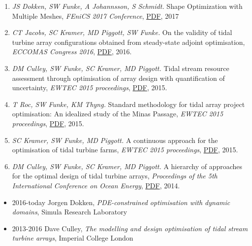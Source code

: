 \documentclass[11pt]{article}
\newenvironment{outerlist}[1][\enskip\textbullet]
        {\begin{itemize}[ #1]}{\end{itemize}}
\begin{document}
\begin{enumerate}
    \item \textit{JS Dokken, SW Funke, A Johannsson, S Schmidt.} Shape Optimization with Multiple Meshes, \textit{FEniCS 2017 Conference}, \href{https://github.com/funsim/cv/raw/master/publications/fenics_2017_proceedings.pdf}{PDF}, 2017
    \item \textit{CT Jacobs, SC Kramer, MD Piggott, SW Funke.} On the validity of tidal turbine array configurations obtained from steady-state adjoint optimisation, \textit{ECCOMAS Congress 2016}, \href{https://github.com/funsim/cv/raw/master/publications/jacobs_eccomas_2016.pdf}{PDF}, 2016.
    \item \textit{DM Culley, SW Funke, SC Kramer, MD Piggott.} Tidal stream resource assessment through optimisation of array design with quantification of uncertainty, \textit{EWTEC 2015 proceedings}, \href{https://github.com/funsim/cv/raw/master/publications/culley_ewtec_2015.pdf}{PDF}, 2015.
    \item \textit{T Roc, SW Funke, KM Thyng.} Standard methodology for tidal array project optimisation: An idealized study of the Minas Passage, \textit{EWTEC 2015 proceedings}, \href{https://github.com/funsim/cv/raw/master/publications/roc_ewtec_2015.pdf}{PDF}, 2015.
    \item \textit{SC Kramer, SW Funke, MD Piggott.} A continuous approach for the optimisation of tidal turbine farms, \textit{EWTEC 2015 proceedings}, \href{https://github.com/funsim/cv/raw/master/publications/kramer_ewtec_2015.pdf}{PDF}, 2015.
    \item \textit{DM Culley, SW Funke, SC Kramer, MD Piggott.} A hierarchy of approaches for the optimal design of tidal turbine arrays, \textit{Proceedings of the 5th International Conference on Ocean Energy}, \href{https://github.com/funsim/cv/raw/master/publications/culley_ewtec_2015.pdf}{PDF}, 2014.
\end{enumerate}



\begin{outerlist}
    \item[2016-today] J\/orgen Dokken, \textit{PDE-constrained optimisation with dynamic domains}, Simula Research Laboratory
    \item[2013-2016] Dave Culley, \textit{The modelling and design optimisation of tidal stream turbine arrays}, Imperial College London
\end{outerlist}
\end{document}
